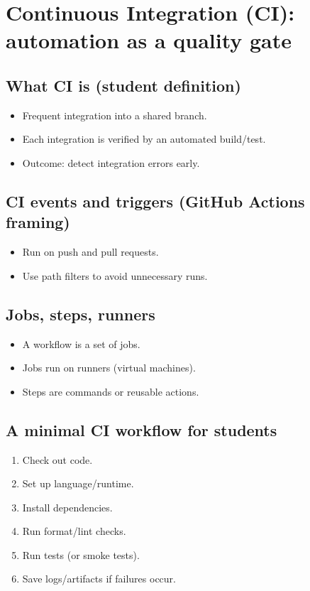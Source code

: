 \section{Continuous Integration (CI): automation as a quality gate}
\subsection{What CI is (student definition)}
\begin{itemize}
\item Frequent integration into a shared branch.
\item Each integration is verified by an automated build/test.
\item Outcome: detect integration errors early.
\end{itemize}

\subsection{CI events and triggers (GitHub Actions framing)}
\begin{itemize}
\item Run on push and pull requests.
\item Use path filters to avoid unnecessary runs.
\end{itemize}

\subsection{Jobs, steps, runners}
\begin{itemize}
\item A workflow is a set of jobs.
\item Jobs run on runners (virtual machines).
\item Steps are commands or reusable actions.
\end{itemize}

\subsection{A minimal CI workflow for students}
\begin{enumerate}
\item Check out code.
\item Set up language/runtime.
\item Install dependencies.
\item Run format/lint checks.
\item Run tests (or smoke tests).
\item Save logs/artifacts if failures occur.
\end{enumerate}

